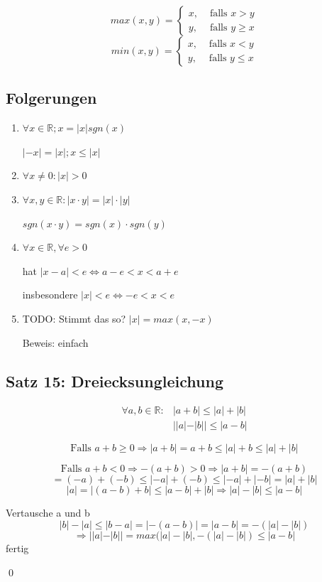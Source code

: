 \documentclass[fleqn]{scrbook}
\newcommand{\R}{\mathbb{R}}
\renewenvironment{proof}{{\bfseries Beweis }}{\qed}
\begin{document}
\[
  max(x,y) = \left\{ 
    \begin{array}{rl}
       x, & \text{ falls } x>y \\
       y, & \text{ falls } y\geq x
    \end{array}\right.
\]
\[
  min(x,y) = \left\{ 
    \begin{array}{rl}
       x, & \text{ falls } x<y \\
       y, & \text{ falls } y\leq x
    \end{array}\right.
\]

\subsection{Folgerungen}

\begin{enumerate}
  \item $\forall x \in \R;x=|x|sgn(x)$
  
    $|-x|=|x|;x \leq |x|$
  \item $\forall x \neq 0: |x|>0$
  \item $\forall x,y \in \R: |x \cdot y|=|x| \cdot |y|$
  
    $sgn(x \cdot y)=sgn(x) \cdot sgn(y)$
  \item $\forall x \in \R, \forall e >0$
  
    hat $|x-a|<e \Longleftrightarrow a-e<x<a+e$
    
    insbesondere $|x|<e \Longleftrightarrow -e<x<e$
  \item TODO: Stimmt das so? $|x|=max(x,-x)$
  
        Beweis: einfach
\end{enumerate}

\subsection{Satz 15: Dreiecksungleichung}

\begin{align*}
  \forall a,b \in \R: & |a+b| \leq |a|+|b|\\
                              & ||a|-|b||\leq|a-b|
\end{align*}

\begin{proof}

\[\text{Falls } a+b \geq 0 \Longrightarrow |a+b|=a+b \leq |a|+b\leq|a|+|b|\]

\[\text{Falls } a+b < 0 \Longrightarrow -(a+b)>0 \Longrightarrow |a+b|=-(a+b)\]
\[=(-a)+(-b)\leq |-a|+(-b)\leq |-a|+ |-b|=|a|+|b|\]
\[|a|=|(a-b)+b|\leq|a-b|+|b|\Longrightarrow |a|-|b|\leq|a-b|\]

Vertausche a und b
\[|b|-|a|\leq |b-a|=|-(a-b)|=|a-b|=-(|a|-|b|)\]
\[\Longrightarrow||a|-|b||=max(|a|-|b|,-(|a|-|b|)\leq |a-b|\]
fertig

\end{proof}
\end{document}
